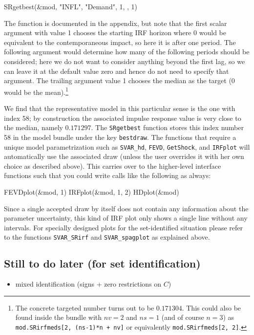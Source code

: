 \documentclass[a4paper,10pt]{article}
\begin{document}
 \begin{code}
 SRgetbest(&mod, "INFL", "Demand", 1, , 1) 
 \end{code}

The function is documented in the appendix, but note that the first scalar argument with value 1 
chooses the starting IRF horizon where 0 would be equivalent to the contemporaneous impact,
so here it is after one period. The following argument would determine
how many of the following periods should be considered; here we do not want to consider anything 
beyond the first lag, so we can leave it at the default value zero and hence do not need to specify 
that argument. The trailing argument value 1 chooses the median as the target (0 would be 
the mean).\footnote{The concrete targeted number turns out to be  $0.171304$. This could also 
be found inside the bundle with $nv=2$ and $ns=1$ (and of course $n=3$) as
\texttt{mod.SRirfmeds[2, (ns-1)*n + nv]} or equivalently \texttt{mod.SRirfmeds[2, 2]}.}

We find that the representative model in this particular sense is the one with index 58; 
by construction the associated impulse response value is very close to the median, namely $0.171297$.
The \texttt{SRgetbest} function stores this index number 58 in the model bundle under the key
\texttt{bestdraw}. The functions that require a unique model parametrization such as 
\texttt{SVAR\_hd}, \texttt{FEVD}, \texttt{GetShock}, and \texttt{IRFplot}  
will automatically use the associated draw (unless the user overrides it with her own choice as
described above). This carries over to the higher-level interface functions such that you could write 
calls like the following as always:

\begin{code}
FEVDplot(&mod, 1)
IRFplot(&mod, 1, 2)
HDplot(&mod)
\end{code}

Since a single accepted draw by itself does not contain any information about the parameter uncertainty, 
this kind of IRF plot only shows a single line without any intervals. For specially designed plots for the 
set-identified situation please refer to the functions \texttt{SVAR\_SRirf} and \texttt{SVAR\_spagplot} 
as explained above.

\subsection{Still to do later (for set identification)}

\begin{itemize}
\item mixed identification (signs + zero restrictions on $C$)
\end{itemize}
\end{document}
